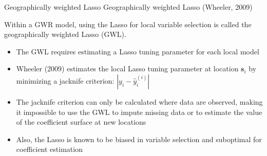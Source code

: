 \documentclass[12pt,t,handout]{beamer}
\newcommand{\subt}[1]{{\footnotesize \color{subtitle} {#1}}}
\begin{document}
\begin{frame}{Geographically weighted Lasso}
\subt{Geographically weighted Lasso (Wheeler, 2009)}

\bigskip
Within a GWR model, using the Lasso for local variable selection is called the geographically weighted Lasso (GWL).
\begin{itemize}
    \item The GWL requires estimating a Lasso tuning parameter for each local model
    \item Wheeler (2009) estimates the local Lasso tuning parameter at location $\bm{s}_i$ by minimizing a jacknife criterion: $|y_i - \hat{y}_i^{(i)}|$
    \item The jacknife criterion can only be calculated where data are observed, making it impossible to use the GWL to impute missing data or to estimate the value of the coefficient surface at new locations
    \item Also, the Lasso is known to be biased in variable selection and suboptimal for coefficient estimation
\end{itemize}

\end{frame}
\end{document}
